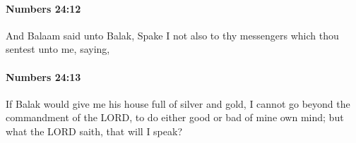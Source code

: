 		\paragraph{Numbers 24:12} %
			\label{NUMBERS-24-12}

			And Balaam said unto Balak, Spake I not also to thy messengers which thou sentest unto me, saying,


		\paragraph{Numbers 24:13} %
			\label{NUMBERS-24-13}

			If Balak would give me his house full of silver and gold, I cannot go beyond the commandment of the LORD, to do either good or bad of mine own mind; but what the LORD saith, that will I speak?


